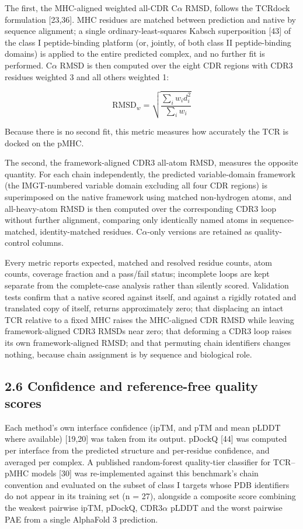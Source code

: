 \documentclass[
  11pt,
]{article}
\begin{document}
The first, the MHC-aligned weighted all-CDR C\ensuremath{\alpha} RMSD, follows the TCRdock
formulation {[}23,36{]}. MHC residues are matched between prediction and
native by sequence alignment; a single ordinary-least-squares Kabsch
superposition {[}43{]} of the class I peptide-binding platform (or, jointly, of
both class II peptide-binding domains) is applied to the entire
predicted complex, and no further fit is performed. C\ensuremath{\alpha} RMSD is then
computed over the eight CDR regions with CDR3 residues weighted 3 and
all others weighted 1:

\[\mathrm{RMSD}_{w} = \sqrt{\frac{\sum_i w_i d_i^2}{\sum_i w_i}}\]

Because there is no second fit, this metric measures how accurately the
TCR is docked on the pMHC.

The second, the framework-aligned CDR3 all-atom RMSD, measures the
opposite quantity. For each chain independently, the predicted
variable-domain framework (the IMGT-numbered variable domain excluding
all four CDR regions) is superimposed on the native framework using
matched non-hydrogen atoms, and all-heavy-atom RMSD is then computed
over the corresponding CDR3 loop without further alignment, comparing
only identically named atoms in sequence-matched, identity-matched
residues. C\ensuremath{\alpha}-only versions are retained as quality-control columns.

Every metric reports expected, matched and resolved residue counts, atom
counts, coverage fraction and a pass/fail status; incomplete loops are
kept separate from the complete-case analysis rather than silently
scored. Validation tests confirm that a native scored against itself,
and against a rigidly rotated and translated copy of itself, returns
approximately zero; that displacing an intact TCR relative to a fixed
MHC raises the MHC-aligned CDR RMSD while leaving framework-aligned CDR3
RMSDs near zero; that deforming a CDR3 loop raises its own
framework-aligned RMSD; and that permuting chain identifiers changes
nothing, because chain assignment is by sequence and biological role.

\subsection{2.6 Confidence and reference-free quality
scores}\label{confidence-and-reference-free-quality-scores}

Each method's own interface confidence (ipTM, and pTM and mean pLDDT
where available) {[}19,20{]} was taken from its output. pDockQ {[}44{]} was computed
per interface from the predicted structure and per-residue confidence,
and averaged per complex. A published random-forest quality-tier
classifier for TCR--pMHC models {[}30{]} was re-implemented against this
benchmark's chain convention and evaluated on the subset of class I
targets whose PDB identifiers do not appear in its training set (n =
27), alongside a composite score combining the weakest pairwise ipTM,
pDockQ, CDR3\ensuremath{\alpha} pLDDT and the worst pairwise PAE from a single AlphaFold 3
prediction.
\end{document}

